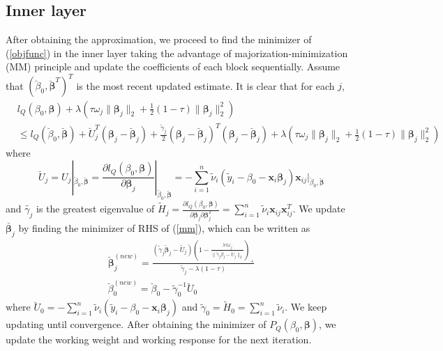 \documentclass[paper=a4, fontsize=11pt]{scrartcl} %
\begin{document}
\subsection*{\textbf{Inner layer}}		
After obtaining the approximation, we proceed to find the minimizer of (\ref{objfunc}) in the inner layer taking the advantage of majorization-minimization (MM) principle and update the coefficients of each block sequentially. Assume that $(\breve{\beta}_{0},\breve{\boldsymbol{\beta}}^{T})^{T}$ is the most recent updated estimate. It is clear that for each $j$,
\begin{equation}\label{mm}
\begin{split}
&l_{Q}(\beta_{0},\boldsymbol{\beta})+\lambda(\tau\omega_{j}\|\boldsymbol{\beta}_{j}\|_{2}+\frac{1}{2}(1-\tau)\|\boldsymbol{\beta}_{j}\|_{2}^{2})\\
&\le l_{Q}(\breve{\beta}_{0},\breve{\boldsymbol{\beta}})+\breve{U}_{j}^{T}(\boldsymbol{\beta}_{j}-\breve{\boldsymbol{\beta}}_{j})+\frac{\tilde{\gamma}_{j}}{2}(\boldsymbol{\beta}_{j}-\breve{\boldsymbol{\beta}}_{j})^{T}(\boldsymbol{\beta}_{j}-\breve{\boldsymbol{\beta}}_{j})+\lambda(\tau\omega_{j}\|\boldsymbol{\beta}_{j}\|_{2}+\frac{1}{2}(1-\tau)\|\boldsymbol{\beta}_{j}\|_{2}^{2})
\end{split}
\end{equation}
where
\begin{equation*}
\breve{U}_{j}=U_{j}|_{\breve{\beta}_{0},\breve{\boldsymbol{\beta}}}=\frac{\partial l_{Q}(\beta_{0},\boldsymbol{\beta})}{\partial \boldsymbol{\beta}_{j}}|_{\breve{\beta}_{0},\breve{\boldsymbol{\beta}}}=-\sum_{i=1}^{n}\tilde{\nu}_{i}(\tilde{y}_{i}-\beta_{0}-\boldsymbol{x}_{i}\boldsymbol{\beta}_{j})\boldsymbol{x}_{ij}|_{\breve{\beta}_{0},\breve{\boldsymbol{\beta}}}
\end{equation*}
and $\tilde{\gamma_{j}}$ is the greatest eigenvalue of $\tilde{H}_{j}=\frac{\partial l_{Q}(\beta_{0},\boldsymbol{\beta})}{\partial \boldsymbol{\beta}_{j}\partial \boldsymbol{\beta}_{j}^{T}}=\sum_{i=1}^{n}\tilde{\nu}_{i}\boldsymbol{x}_{ij}\boldsymbol{x}_{ij}^{T}$. We update $\breve{\boldsymbol{\beta}_{j}}$ by finding the minimizer of RHS of (\ref{mm}), which can be written as
\begin{equation*}
\begin{split}
\breve{\boldsymbol{\beta}}_{j}^{(new)}=\frac{(\tilde{\gamma}_{j}\breve{\boldsymbol{\beta}}_{j}-\breve{U}_{j})(1-\frac{\lambda\tau\omega_{j}}{\|\tilde{\gamma}_{j}\breve{\beta}_{j}-\breve{U}_{j}\|_{2}})_{+}}{\tilde{\gamma}_{j}-\lambda(1-\tau)}\\
\breve{\beta}_{0}^{(new)}=\breve{\beta}_{0}-\tilde{\gamma}_{0}^{-1}\breve{U}_{0}
\end{split}
\end{equation*}
where $\breve{U}_{0}=-\sum_{i=1}^{n}\tilde{\nu}_{i}(\tilde{y}_{i}-\beta_{0}-\boldsymbol{x}_{i}\boldsymbol{\beta}_{j})$ and $\tilde{\gamma}_{0}=\tilde{H}_{0}=\sum_{i=1}^{n}\tilde{\nu}_{i}$. We keep updating until convergence. After obtaining the minimizer of $P_{Q}(\beta_{0},\boldsymbol{\beta})$, we update the working weight and working response for the next iteration.\\
\end{document}
